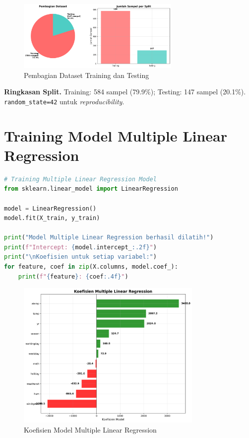 \documentclass[11pt,a4paper]{article}
\begin{document}
\begin{figure}[h]
    \centering
    \includegraphics[width=0.7\textwidth]{./OUTPUT/step6_train_test_split.png}
    \caption{Pembagian Dataset Training dan Testing}
    \label{fig:train_test_split}
\end{figure}

\noindent\textbf{Ringkasan Split.}
Training: 584 sampel (79{.}9\%); Testing: 147 sampel (20{.}1\%). \texttt{random\_state=42} untuk \textit{reproducibility}.

\section{Training Model Multiple Linear Regression}
\begin{lstlisting}[language=Python]
# Training Multiple Linear Regression Model
from sklearn.linear_model import LinearRegression

model = LinearRegression()
model.fit(X_train, y_train)

print("Model Multiple Linear Regression berhasil dilatih!")
print(f"Intercept: {model.intercept_:.2f}")
print("\nKoefisien untuk setiap variabel:")
for feature, coef in zip(X.columns, model.coef_):
    print(f"{feature}: {coef:.4f}")
\end{lstlisting}

\begin{figure}[h]
    \centering
    \includegraphics[width=0.8\textwidth]{./OUTPUT/step7_model_coefficients.png}
    \caption{Koefisien Model Multiple Linear Regression}
    \label{fig:model_coefficients}
\end{figure}
\end{document}
